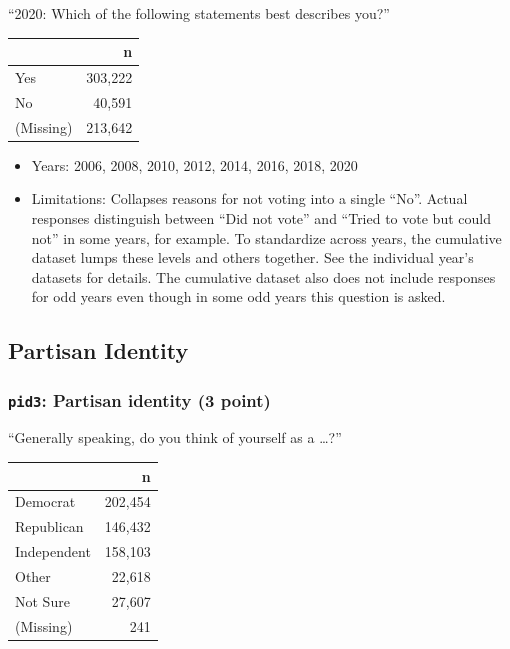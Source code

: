\documentclass[10pt,article,oneside]{memoir}
\theoremstyle{definition}
\begin{document}
``2020: Which of the following statements best describes you?''

\begin{table}[H]
\centering
\begin{tabular}[t]{lr}
\toprule
 & n\\
\midrule
Yes & 303,222\\
No & 40,591\\
(Missing) & 213,642\\
\bottomrule
\end{tabular}
\end{table}

\begin{itemize}
\tightlist
\item
  Years: 2006, 2008, 2010, 2012, 2014, 2016, 2018, 2020
\item
  Limitations: Collapses reasons for not voting into a single ``No''.
  Actual responses distinguish between ``Did not vote'' and ``Tried to
  vote but could not'' in some years, for example. To standardize across
  years, the cumulative dataset lumps these levels and others together.
  See the individual year's datasets for details. The cumulative dataset
  also does not include responses for odd years even though in some odd
  years this question is asked.
\end{itemize}

\newpage

\hypertarget{partisan-identity}{%
\subsection{Partisan Identity}\label{partisan-identity}}

\hypertarget{pid3-partisan-identity-3-point}{%
\subsubsection{\texorpdfstring{\texttt{pid3}: Partisan identity (3
point)}{pid3: Partisan identity (3 point)}}\label{pid3-partisan-identity-3-point}}

``Generally speaking, do you think of yourself as a \ldots?''

\begin{table}[H]
\centering
\begin{tabular}[t]{lr}
\toprule
 & n\\
\midrule
Democrat & 202,454\\
Republican & 146,432\\
Independent & 158,103\\
Other & 22,618\\
Not Sure & 27,607\\
(Missing) & 241\\
\bottomrule
\end{tabular}
\end{table}
\end{document}
